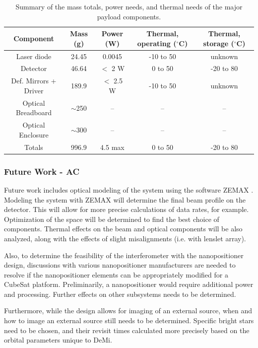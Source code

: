 \documentclass[12pt]{article}
\begin{document}
\begin{table}
\caption{Summary of the mass totals, power needs, and thermal needs of the major payload components.}
\begin{tabular}{|c||c|c|c|c|} \hline
	Component & Mass (g) & Power (W) & Thermal, operating ($^\circ$C) & Thermal, storage ($^\circ$C) \\ \hline \hline
Laser diode & 24.45 & 0.0045 & -10 to 50 & unknown \\
Detector & 46.64 & $<$ 2 W & 0 to 50 & -20 to 80 \\
Def. Mirrors + Driver & 189.9 & $<$ 2.5 W & -10 to 50 & unknown \\
Optical Breadboard & $\sim$250 & -- & -- & -- \\
Optical Enclosure & $\sim$300 & -- & -- & -- \\ \hline \hline
Totals & 996.9 & 4.5 max & 0 to 50 & -20 to 80 \\ \hline
\end{tabular}\label{fig:payload_summary_table}
\end{table}

			\subsubsection{Future Work - AC}

Future work includes optical modeling of the system using the software ZEMAX \cite{zemax}. Modeling the system with ZEMAX will determine the
  final beam profile on the detector.  This will allow for more precise calculations of data rates, for example.  Optimization of the space will
  be determined to find the best choice of components.  Thermal
  effects on the beam and optical components will be also analyzed, along with the effects of slight misalignments (i.e. with lenslet array).

Also, to determine the feasibility of the interferometer with the nanopositioner design, discussions with various nanopositioner manufacturers are needed to resolve if the nanopositioner elements can be appropriately modified for a CubeSat platform.  Preliminarily, a nanopositioner would require additional power and processing.  Further effects on other subsystems needs to be determined. 

Furthermore, while the design allows for imaging of an external source, when and how to image an external
  source still needs to be determined. Specific bright stars need to be chosen, and their revisit times calculated more precisely based on the orbital parameters unique to DeMi.
\end{document}
